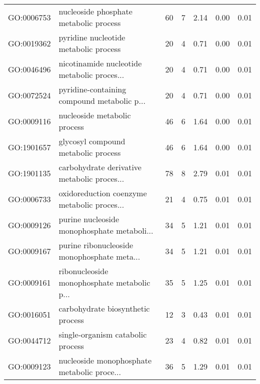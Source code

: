\begin{table}[ht]
\begin{tabular}{llrrrrr}
  GO:0006753 & nucleoside phosphate metabolic process &  60 &   7 & 2.14 & 0.00 & 0.01 \\ 
  GO:0019362 & pyridine nucleotide metabolic process &  20 &   4 & 0.71 & 0.00 & 0.01 \\ 
  GO:0046496 & nicotinamide nucleotide metabolic proces... &  20 &   4 & 0.71 & 0.00 & 0.01 \\ 
  GO:0072524 & pyridine-containing compound metabolic p... &  20 &   4 & 0.71 & 0.00 & 0.01 \\ 
  GO:0009116 & nucleoside metabolic process &  46 &   6 & 1.64 & 0.00 & 0.01 \\ 
  GO:1901657 & glycosyl compound metabolic process &  46 &   6 & 1.64 & 0.00 & 0.01 \\ 
  GO:1901135 & carbohydrate derivative metabolic proces... &  78 &   8 & 2.79 & 0.01 & 0.01 \\ 
  GO:0006733 & oxidoreduction coenzyme metabolic proces... &  21 &   4 & 0.75 & 0.01 & 0.01 \\ 
  GO:0009126 & purine nucleoside monophosphate metaboli... &  34 &   5 & 1.21 & 0.01 & 0.01 \\ 
  GO:0009167 & purine ribonucleoside monophosphate meta... &  34 &   5 & 1.21 & 0.01 & 0.01 \\ 
  GO:0009161 & ribonucleoside monophosphate metabolic p... &  35 &   5 & 1.25 & 0.01 & 0.01 \\ 
  GO:0016051 & carbohydrate biosynthetic process &  12 &   3 & 0.43 & 0.01 & 0.01 \\ 
  GO:0044712 & single-organism catabolic process &  23 &   4 & 0.82 & 0.01 & 0.01 \\ 
  GO:0009123 & nucleoside monophosphate metabolic proce... &  36 &   5 & 1.29 & 0.01 & 0.01 \\ 
   \hline
\end{tabular}
\end{table}
